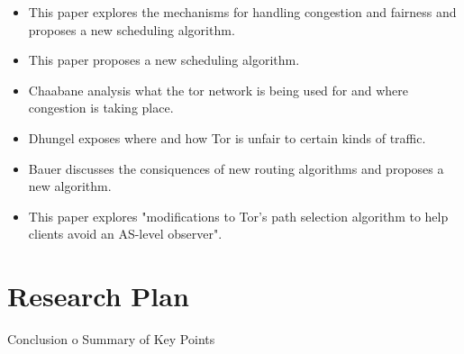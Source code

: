 \documentclass[letterpaper,12pt]{texMemo}
\begin{document}
\begin{itemize}
    \item
    \citep[]{unfair} This paper explores the mechanisms for handling congestion
    and fairness and proposes a new scheduling algorithm.
    \item
    \citep[]{Tang} This paper proposes a new scheduling algorithm.
    \item
    \citep[]{analysis} Chaabane analysis what the tor network is being used for and where congestion is taking place.
    \item
    \citep[]{delay} Dhungel exposes where and how Tor is unfair to certain kinds of traffic.
    \item
    \citep[]{Bauer} Bauer discusses the consiquences of new routing algorithms and proposes a new
    algorithm.
    \item
    \citep[]{Edman} This paper explores "modifications to Tor's path selection algorithm to help clients avoid
    an AS-level observer".
\end{itemize}


\section*{Research Plan}
Conclusion
    o Summary of Key Points






\end{document}
